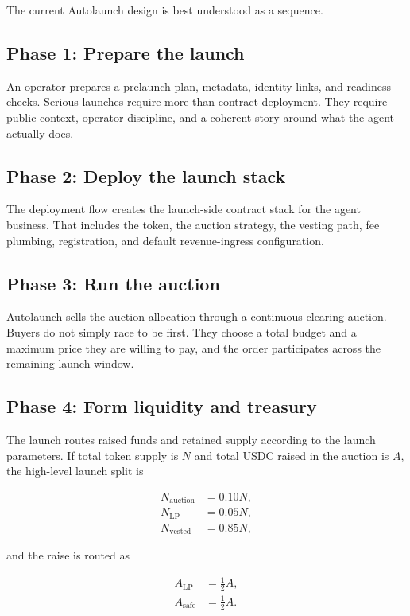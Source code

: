 \documentclass[11pt]{article}
\newcommand{\USDC}{\textsc{USDC}}
\begin{document}
The current Autolaunch design is best understood as a sequence.

\subsection{Phase 1: Prepare the launch}

An operator prepares a prelaunch plan, metadata, identity links, and readiness checks. Serious launches require more than contract deployment. They require public context, operator discipline, and a coherent story around what the agent actually does.

\subsection{Phase 2: Deploy the launch stack}

The deployment flow creates the launch-side contract stack for the agent business. That includes the token, the auction strategy, the vesting path, fee plumbing, registration, and default revenue-ingress configuration.

\subsection{Phase 3: Run the auction}

Autolaunch sells the auction allocation through a continuous clearing auction. Buyers do not simply race to be first. They choose a total budget and a maximum price they are willing to pay, and the order participates across the remaining launch window.

\subsection{Phase 4: Form liquidity and treasury}

The launch routes raised funds and retained supply according to the launch parameters. If total token supply is \(N\) and total \USDC{} raised in the auction is \(A\), the high-level launch split is

\begin{align}
N_{\text{auction}} &= 0.10N, \\
N_{\text{LP}} &= 0.05N, \\
N_{\text{vested}} &= 0.85N,
\end{align}

and the raise is routed as

\begin{align}
A_{\text{LP}} &= \tfrac{1}{2}A, \\
A_{\text{safe}} &= \tfrac{1}{2}A.
\end{align}
\end{document}
